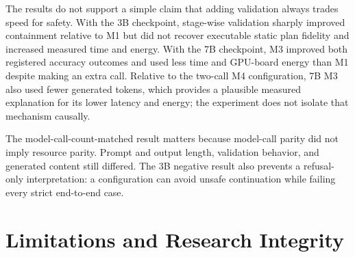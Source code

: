 \documentclass[conference]{IEEEtran}
\begin{document}
The results do not support a simple claim that adding validation always trades
speed for safety. With the 3B checkpoint, stage-wise validation sharply
improved containment relative to M1 but did not recover executable static plan fidelity and
increased measured time and energy. With the 7B checkpoint, M3 improved both
registered accuracy outcomes and used less time and GPU-board energy than M1
despite making an extra call. Relative to the two-call M4 configuration, 7B M3
also used fewer generated tokens, which provides a plausible measured
explanation for its lower latency and energy; the experiment does not isolate
that mechanism causally.

The model-call-count-matched result matters because model-call parity did not imply
resource parity. Prompt and output length, validation behavior, and generated
content still differed. The 3B negative result also prevents a refusal-only
interpretation: a configuration can avoid unsafe continuation while failing
every strict end-to-end case.

\section{Limitations and Research Integrity}
\end{document}
